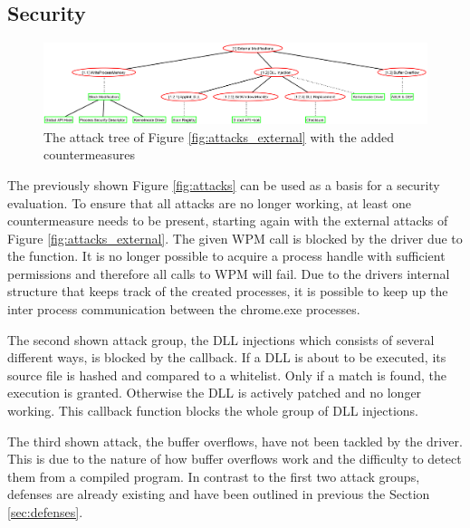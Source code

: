 \subsection{Security}
\begin{figure}[!htbp]
\centering
\includegraphics[angle=90,scale=0.3]{sections/adtrees/ExternalModifications.png}
\caption{The attack tree of Figure \ref{fig:attacks_external} with the added countermeasures}
\label{fig:attacks_external_def}
\end{figure}
The previously shown Figure \ref{fig:attacks} can be used as a basis for a security evaluation. To ensure that all attacks are no longer working, at least one countermeasure needs to be present, starting again with the external attacks of Figure \ref{fig:attacks_external}. The given \gls{WPM} call is blocked by the driver due to the  function. It is no longer possible to acquire a process handle with sufficient permissions and therefore all calls to \gls{WPM} will fail. Due to the drivers internal structure that keeps track of the created processes, it is possible to keep up the inter process communication between the chrome.exe processes. 

The second shown attack group, the \gls{DLL} injections which consists of several different ways, is blocked by the  callback. If a \gls{DLL} is about to be executed, its source file is hashed and compared to a whitelist. Only if a match is found, the execution is granted. Otherwise the \gls{DLL} is actively patched and no longer working. This callback function blocks the whole group of \gls{DLL} injections.

The third shown attack, the buffer overflows, have not been tackled by the driver. This is due to the nature of how buffer overflows work and the difficulty to detect them from a compiled program. In contrast to the first two attack groups, defenses are already existing and have been outlined in previous the Section \ref{sec:defenses}.

